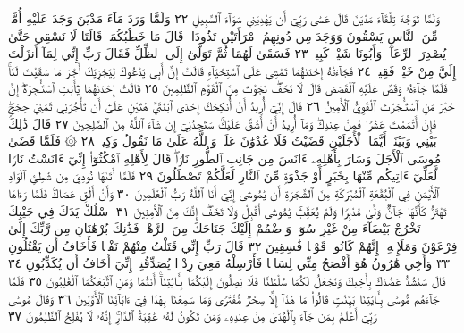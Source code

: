 وَلَمَّا تَوَجَّهَ تِلْقَآءَ مَدْيَنَ قَالَ عَسَىٰ رَبِّيٓ أَن يَهْدِيَنِي سَوَآءَ
ٱلسَّبِيلِ ٢٢ وَلَمَّا وَرَدَ مَآءَ مَدْيَنَ وَجَدَ عَلَيْهِ أُمَّةࣰ مِّنَ
ٱلنَّاسِ يَسْقُونَ وَوَجَدَ مِن دُونِهِمُ ٱمْرَأَتَيْنِ تَذُودَانِۖ قَالَ
مَا خَطْبُكُمَاۖ قَالَتَا لَا نَسْقِي حَتَّىٰ يُصْدِرَ ٱلرِّعَآءُۖ وَأَبُونَا
شَيْخࣱ كَبِيرࣱ ٢٣ فَسَقَىٰ لَهُمَا ثُمَّ تَوَلَّىٰٓ إِلَى ٱلظِّلِّ فَقَالَ
رَبِّ إِنِّي لِمَآ أَنزَلْتَ إِلَيَّ مِنْ خَيْرࣲ فَقِيرࣱ ٢٤ فَجَآءَتْهُ إِحْدَىٰهُمَا
تَمْشِي عَلَى ٱسْتِحْيَآءࣲ قَالَتْ إِنَّ أَبِي يَدْعُوكَ لِيَجْزِيَكَ
أَجْرَ مَا سَقَيْتَ لَنَاۚ فَلَمَّا جَآءَهُۥ وَقَصَّ عَلَيْهِ ٱلْقَصَصَ قَالَ
لَا تَخَفْۖ نَجَوْتَ مِنَ ٱلْقَوْمِ ٱلظَّٰلِمِينَ ٢٥ قَالَتْ إِحْدَىٰهُمَا
يَٰٓأَبَتِ ٱسْتَـْٔجِرْهُۖ إِنَّ خَيْرَ مَنِ ٱسْتَـْٔجَرْتَ ٱلْقَوِيُّ ٱلْأَمِينُ ٢٦
قَالَ إِنِّيٓ أُرِيدُ أَنْ أُنكِحَكَ إِحْدَى ٱبْنَتَيَّ هَٰتَيْنِ عَلَىٰٓ أَن
تَأْجُرَنِي ثَمَٰنِيَ حِجَجࣲۖ فَإِنْ أَتْمَمْتَ عَشْرࣰا فَمِنْ عِندِكَۖ
وَمَآ أُرِيدُ أَنْ أَشُقَّ عَلَيْكَۚ سَتَجِدُنِيٓ إِن شَآءَ ٱللَّهُ مِنَ
ٱلصَّٰلِحِينَ ٢٧ قَالَ ذَٰلِكَ بَيْنِي وَبَيْنَكَۖ أَيَّمَا ٱلْأَجَلَيْنِ
قَضَيْتُ فَلَا عُدْوَٰنَ عَلَيَّۖ وَٱللَّهُ عَلَىٰ مَا نَقُولُ وَكِيلࣱ ٢٨
۞ فَلَمَّا قَضَىٰ مُوسَى ٱلْأَجَلَ وَسَارَ بِأَهْلِهِۦٓ ءَانَسَ مِن جَانِبِ
ٱلطُّورِ نَارࣰاۖ قَالَ لِأَهْلِهِ ٱمْكُثُوٓا۟ إِنِّيٓ ءَانَسْتُ نَارࣰا لَّعَلِّيٓ ءَاتِيكُم
مِّنْهَا بِخَبَرٍ أَوْ جَذْوَةࣲ مِّنَ ٱلنَّارِ لَعَلَّكُمْ تَصْطَلُونَ ٢٩
فَلَمَّآ أَتَىٰهَا نُودِيَ مِن شَٰطِئِ ٱلْوَادِ ٱلْأَيْمَنِ فِي ٱلْبُقْعَةِ
ٱلْمُبَٰرَكَةِ مِنَ ٱلشَّجَرَةِ أَن يَٰمُوسَىٰٓ إِنِّيٓ أَنَا ٱللَّهُ رَبُّ
ٱلْعَٰلَمِينَ ٣٠ وَأَنْ أَلْقِ عَصَاكَۚ فَلَمَّا رَءَاهَا تَهْتَزُّ كَأَنَّهَا
جَآنࣱّ وَلَّىٰ مُدْبِرࣰا وَلَمْ يُعَقِّبْۚ يَٰمُوسَىٰٓ أَقْبِلْ وَلَا تَخَفْۖ
إِنَّكَ مِنَ ٱلْأٓمِنِينَ ٣١ ٱسْلُكْ يَدَكَ فِي جَيْبِكَ تَخْرُجْ
بَيْضَآءَ مِنْ غَيْرِ سُوٓءࣲ وَٱضْمُمْ إِلَيْكَ جَنَاحَكَ مِنَ ٱلرَّهْبِۖ
فَذَٰنِكَ بُرْهَٰنَانِ مِن رَّبِّكَ إِلَىٰ فِرْعَوْنَ وَمَلَإِي۟هِۦٓۚ إِنَّهُمْ
كَانُوا۟ قَوْمࣰا فَٰسِقِينَ ٣٢ قَالَ رَبِّ إِنِّي قَتَلْتُ مِنْهُمْ نَفْسࣰا
فَأَخَافُ أَن يَقْتُلُونِ ٣٣ وَأَخِي هَٰرُونُ هُوَ أَفْصَحُ مِنِّي لِسَانࣰا
فَأَرْسِلْهُ مَعِيَ رِدْءࣰا يُصَدِّقُنِيٓۖ إِنِّيٓ أَخَافُ أَن يُكَذِّبُونِ ٣٤
قَالَ سَنَشُدُّ عَضُدَكَ بِأَخِيكَ وَنَجْعَلُ لَكُمَا سُلْطَٰنࣰا فَلَا
يَصِلُونَ إِلَيْكُمَا بِـَٔايَٰتِنَآۚ أَنتُمَا وَمَنِ ٱتَّبَعَكُمَا ٱلْغَٰلِبُونَ ٣٥
فَلَمَّا جَآءَهُم مُّوسَىٰ بِـَٔايَٰتِنَا بَيِّنَٰتࣲ قَالُوا۟ مَا هَٰذَآ إِلَّا سِحْرࣱ
مُّفْتَرࣰى وَمَا سَمِعْنَا بِهَٰذَا فِيٓ ءَابَآئِنَا ٱلْأَوَّلِينَ ٣٦
وَقَالَ مُوسَىٰ رَبِّيٓ أَعْلَمُ بِمَن جَآءَ بِٱلْهُدَىٰ مِنْ عِندِهِۦ وَمَن
تَكُونُ لَهُۥ عَٰقِبَةُ ٱلدَّارِۚ إِنَّهُۥ لَا يُفْلِحُ ٱلظَّٰلِمُونَ ٣٧
